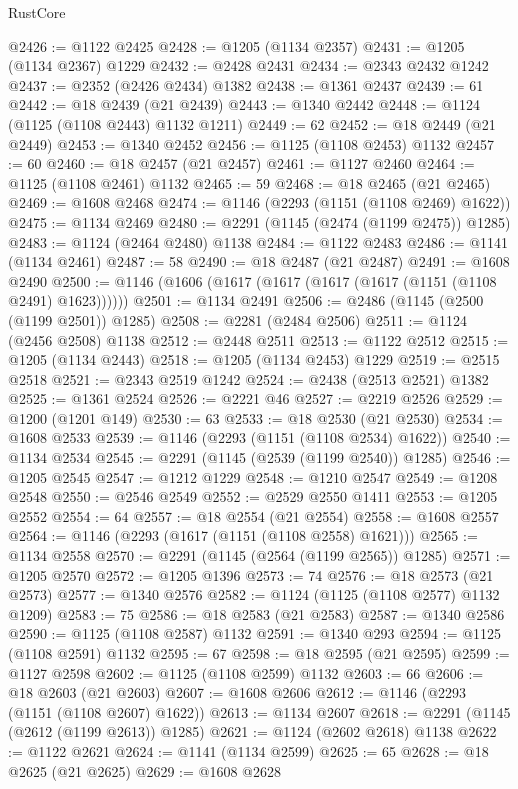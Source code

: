 \begin{lexlean}{RustCore}
\begin{coremodule}
@2426 := @1122 @2425
@2428 := @1205 (@1134 @2357)
@2431 := @1205 (@1134 @2367) @1229
@2432 := @2428 @2431
@2434 := @2343 @2432 @1242
@2437 := @2352 (@2426 @2434) @1382
@2438 := @1361 @2437
@2439 := 61
@2442 := @18 @2439 (@21 @2439)
@2443 := @1340 @2442
@2448 := @1124 (@1125 (@1108 @2443) @1132 @1211)
@2449 := 62
@2452 := @18 @2449 (@21 @2449)
@2453 := @1340 @2452
@2456 := @1125 (@1108 @2453) @1132
@2457 := 60
@2460 := @18 @2457 (@21 @2457)
@2461 := @1127 @2460
@2464 := @1125 (@1108 @2461) @1132
@2465 := 59
@2468 := @18 @2465 (@21 @2465)
@2469 := @1608 @2468
@2474 := @1146 (@2293 (@1151 (@1108 @2469) @1622))
@2475 := @1134 @2469
@2480 := @2291 (@1145 (@2474 (@1199 @2475)) @1285)
@2483 := @1124 (@2464 @2480) @1138
@2484 := @1122 @2483
@2486 := @1141 (@1134 @2461)
@2487 := 58
@2490 := @18 @2487 (@21 @2487)
@2491 := @1608 @2490
@2500 := @1146 (@1606 (@1617 (@1617 (@1617 (@1617 (@1151 (@1108 @2491) @1623))))))
@2501 := @1134 @2491
@2506 := @2486 (@1145 (@2500 (@1199 @2501)) @1285)
@2508 := @2281 (@2484 @2506)
@2511 := @1124 (@2456 @2508) @1138
@2512 := @2448 @2511
@2513 := @1122 @2512
@2515 := @1205 (@1134 @2443)
@2518 := @1205 (@1134 @2453) @1229
@2519 := @2515 @2518
@2521 := @2343 @2519 @1242
@2524 := @2438 (@2513 @2521) @1382
@2525 := @1361 @2524
@2526 := @2221 @46
@2527 := @2219 @2526
@2529 := @1200 (@1201 @149)
@2530 := 63
@2533 := @18 @2530 (@21 @2530)
@2534 := @1608 @2533
@2539 := @1146 (@2293 (@1151 (@1108 @2534) @1622))
@2540 := @1134 @2534
@2545 := @2291 (@1145 (@2539 (@1199 @2540)) @1285)
@2546 := @1205 @2545
@2547 := @1212 @1229
@2548 := @1210 @2547
@2549 := @1208 @2548
@2550 := @2546 @2549
@2552 := @2529 @2550 @1411
@2553 := @1205 @2552
@2554 := 64
@2557 := @18 @2554 (@21 @2554)
@2558 := @1608 @2557
@2564 := @1146 (@2293 (@1617 (@1151 (@1108 @2558) @1621)))
@2565 := @1134 @2558
@2570 := @2291 (@1145 (@2564 (@1199 @2565)) @1285)
@2571 := @1205 @2570
@2572 := @1205 @1396
@2573 := 74
@2576 := @18 @2573 (@21 @2573)
@2577 := @1340 @2576
@2582 := @1124 (@1125 (@1108 @2577) @1132 @1209)
@2583 := 75
@2586 := @18 @2583 (@21 @2583)
@2587 := @1340 @2586
@2590 := @1125 (@1108 @2587) @1132
@2591 := @1340 @293
@2594 := @1125 (@1108 @2591) @1132
@2595 := 67
@2598 := @18 @2595 (@21 @2595)
@2599 := @1127 @2598
@2602 := @1125 (@1108 @2599) @1132
@2603 := 66
@2606 := @18 @2603 (@21 @2603)
@2607 := @1608 @2606
@2612 := @1146 (@2293 (@1151 (@1108 @2607) @1622))
@2613 := @1134 @2607
@2618 := @2291 (@1145 (@2612 (@1199 @2613)) @1285)
@2621 := @1124 (@2602 @2618) @1138
@2622 := @1122 @2621
@2624 := @1141 (@1134 @2599)
@2625 := 65
@2628 := @18 @2625 (@21 @2625)
@2629 := @1608 @2628

\end{coremodule}
\end{lexlean}
